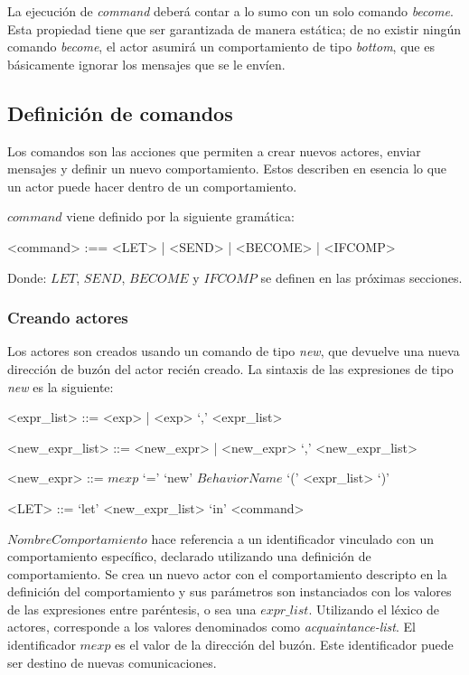 La ejecución de \textit{command} deberá contar a lo sumo con un solo comando \textit{become}. Esta propiedad tiene que ser garantizada de manera estática; de no existir ningún comando \textit{become}, el actor asumirá un comportamiento de tipo \textit{bottom}, que es básicamente ignorar los mensajes que se le envíen.

\subsection{Definición de comandos}\label{actores:cmd}
Los comandos son las acciones que permiten a \SAL crear nuevos actores, enviar mensajes y definir un nuevo comportamiento. Estos describen en esencia lo que un actor puede hacer dentro de un comportamiento.

$command$ viene definido por la siguiente gramática:
\begin{grammar}
<command> :== <LET> | <SEND> | <BECOME> | <IFCOMP>
\end{grammar}

Donde: $LET$, $SEND$, $BECOME$ y $IFCOMP$ se definen en las próximas secciones.

\subsubsection*{Creando actores}
Los actores son creados usando un comando de tipo \textit{new}, que devuelve una nueva dirección de buzón del actor recién creado. La sintaxis de las expresiones de tipo \textit{new} es la siguiente:

\begin{grammar}
  <expr_list> ::= <exp> | <exp> `,' <expr_list>  

  <new_expr_list> ::= <new_expr> | <new_expr> `,' <new_expr_list>
  
  <new_expr> ::= $mexp$ `=' `new' $BehaviorName$ `(' <expr_list> `)'
  
  <LET> ::=  `let' <new_expr_list> `in' <command> 
\end{grammar}

$NombreComportamiento$ hace referencia a un identificador vinculado con un comportamiento específico, declarado utilizando una definición de comportamiento. Se crea un nuevo actor con el comportamiento descripto en la definición del comportamiento y sus parámetros son instanciados con los valores de las expresiones entre paréntesis, o sea una $expr\_list$. Utilizando el léxico de actores, corresponde a los valores denominados como \textit{acquaintance-list}. El identificador $mexp$ es el valor de la dirección del buzón. Este identificador puede ser destino de nuevas comunicaciones. 

